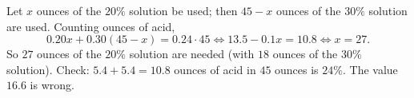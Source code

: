 Let $x$ ounces of the $20\%$ solution be used; then $45-x$ ounces of the $30\%$ solution are used. Counting ounces of acid,
\[
0.20x+0.30(45-x)=0.24\cdot45\iff 13.5-0.1x=10.8\iff x=27 .
\]
So $\boxed{27}$ ounces of the $20\%$ solution are needed (with $18$ ounces of the $30\%$ solution). Check: $5.4+5.4=10.8$ ounces of acid in $45$ ounces is $24\%$. The value $16.6$ is wrong.
